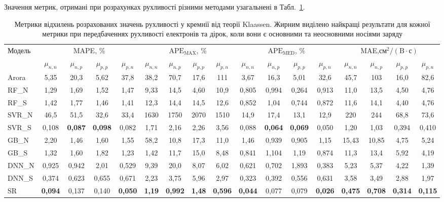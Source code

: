 \documentclass[12pt,a4paper,titlepage,oneside]{book}
\numberwithin{equation}{part}
\begin{document}
Значення метрик, отримані при розрахунках рухливості різними методами узагальнені в Табл.~\ref{tblSum}.

\begin{landscape}

\vspace{30mm}

\begin{table}[htbp]
\renewcommand{\arraystretch}{1.5}
\centering
\caption{Метрики відхилень розрахованих значень рухливості у кремнії від теорії Klaassen.
Жирним виділено найкращі результати для кожної метрики при передбаченнях рухливості електронів та дірок, коли вони є основними та неосновними носіями заряду}
\label{tblSum}
\begin{tabular}{|l|c|c|c|c|c|c|c|c|c|c|c|c|c|c|c|c|}
\hline
\multirow{2}{*}{Модель}&\multicolumn{4}{c|}{MAPE, \%}&\multicolumn{4}{c|}{$\mathrm{APE}_\mathrm{MAX}$, \%}
   &\multicolumn{4}{c|}{$\mathrm{APE}_\mathrm{MED}$, \%}&\multicolumn{4}{c|}{MAE,$\text{см}^2/(\text{B}\cdot\text{с})$}\\
\cline{2-17}
&$\mu_{n,n}$&$\mu_{n,p}$&$\mu_{p,p}$&$\mu_{p,n}$&$\mu_{n,n}$&$\mu_{n,p}$&$\mu_{p,p}$&$\mu_{p,n}$
&$\mu_{n,n}$&$\mu_{n,p}$&$\mu_{p,p}$&$\mu_{p,n}$&$\mu_{n,n}$&$\mu_{n,p}$&$\mu_{p,p}$&$\mu_{p,n}$\\
\hline
Arora \cite{Arora1982}&5,35&20,3&5,62&37,8&38,2&70,7&17,6&111&3,67&16,3&5,01&32,6&45,7&103&16,0&82,6\\
\hline
RF\_N &1,29&1,69&1,52&1,47&9,33&14,5&4,60&10,9&0,805&0,994&0,264&0,913&11,0&13,5&4,50&4,76\\
\hline
RF\_S&1,42&1,77&1,46&1,41&12,3&14,4&14,5&12,6&0,852&1,04&0,744&0,872&11,6&14,1&4,40&4,76\\
\hline
SVR\_N&46,5&51,5&32,6&33,4&1630&1750&2070&1510&14,9&17,4&13,1&12,9&220&244&68,8&73,6\\
\hline
SVR\_S&0,108&\textbf{0,087}&\textbf{0,098}&0,082&1,71&2,16&2,26&3,56&0,088&\textbf{0,064}&\textbf{0,069}&0,050&1,20&1,03&0,394&0,410\\
\hline
GB\_N&2,20&1,46&1,60&1,55&58,2&10,8&17,3&11,0&1,46&0,939&0,905&1,15&15,43&10,85&4,75&5,24\\
\hline
GB\_S&1,32&1,60&1,82&1,23&1,42&11,7&15,0&8,48&0,841&1,104&1,19&0,874&11,3&13,4&5,92&4,19\\
\hline
DNN\_N&0,925&0,942&2,01&0,529&9,39&20,0&8,07&6,02&0,621&0,702&1,893&0,383&5,23&5,37&4,22&1,39\\
\hline
DNN\_S&0,374&0,623&0,655&0,671&2,23&3,75&5,96&2,97&0,323&0,392&0,556&0,631&3,58&3,49&2,88&1,97\\
\hline
SR&\textbf{0,094}&0,137&0,140&\textbf{0,050}&\textbf{1,19}&\textbf{0,992}&\textbf{1,48}&\textbf{0,596}&\textbf{0,044}&0,077&0,079&\textbf{0,026}&\textbf{0,475}
   &\textbf{0,708}&\textbf{0,314}&\textbf{0,115}\\
\hline
\end{tabular}
\end{table}
\end{landscape}
\end{document}

